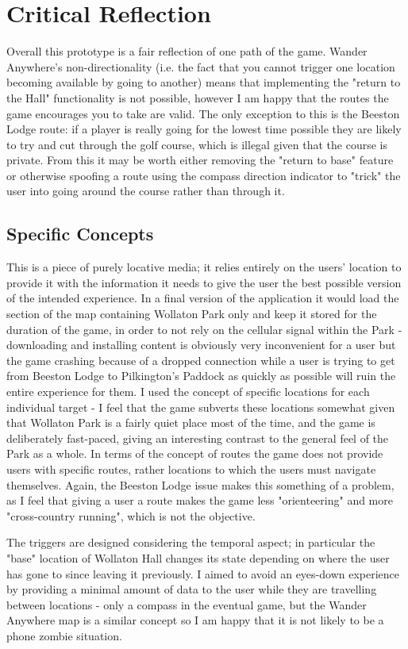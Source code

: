 \documentclass[12pt, a4paper]{article}
\begin{document}
\section{Critical Reflection}
Overall this prototype is a fair reflection of one path of the game.
Wander Anywhere's non-directionality (i.e. the fact that you cannot trigger one location becoming available by going to another) means that implementing the "return to the Hall" functionality is not possible, however I am happy that the routes the game encourages you to take are valid.
The only exception to this is the Beeston Lodge route: if a player is really going for the lowest time possible they are likely to try and cut through the golf course, which is illegal given that the course is private.
From this it may be worth either removing the "return to base" feature or otherwise spoofing a route using the compass direction indicator to "trick" the user into going around the course rather than through it.

\subsection{Specific Concepts}
This is a piece of purely locative media; it relies entirely on the users' location to provide it with the information it needs to give the user the best possible version of the intended experience.
In a final version of the application it would load the section of the map containing Wollaton Park only and keep it stored for the duration of the game, in order to not rely on the cellular signal within the Park - downloading and installing content is obviously very inconvenient for a user but the game crashing because of a dropped connection while a user is trying to get from Beeston Lodge to Pilkington's Paddock as quickly as possible will ruin the entire experience for them.
I used the concept of specific locations for each individual target - I feel that the game subverts these locations somewhat given that Wollaton Park is a fairly quiet place most of the time, and the game is deliberately fast-paced, giving an interesting contrast to the general feel of the Park as a whole.
In terms of the concept of routes the game does not provide users with specific routes, rather locations to which the users must navigate themselves.
Again, the Beeston Lodge issue makes this something of a problem, as I feel that giving a user a route makes the game less "orienteering" and more "cross-country running", which is not the objective.
\par
The triggers are designed considering the temporal aspect; in particular the "base" location of Wollaton Hall changes its state depending on where the user has gone to since leaving it previously.
I aimed to avoid an eyes-down experience by providing a minimal amount of data to the user while they are travelling between locations - only a compass in the eventual game, but the Wander Anywhere map is a similar concept so I am happy that it is not likely to be a phone zombie situation.
\end{document}
